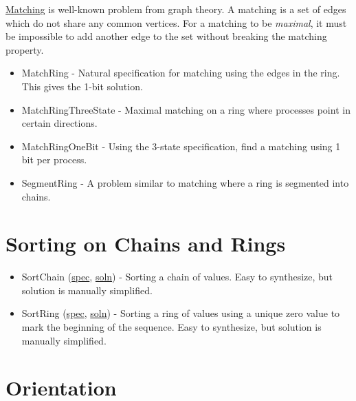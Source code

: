 \href{http://en.wikipedia.org/wiki/Matching_(graph_theory)}{Matching} is well-known problem from graph theory.
A matching is a set of edges which do not share any common vertices.
For a matching to be \textit{maximal}, it must be impossible to add another edge to the set without breaking the matching property.
\begin{itemize}
\item MatchRing \href{example/Matching.html#sec:MatchRing}{\LinkText}
- Natural specification for matching using the edges in the ring.
This gives the 1-bit solution.
\item MatchRingThreeState \href{example/Matching.html#sec:MatchRingThreeState}{\LinkText}
- Maximal matching on a ring where processes point in certain directions.
\item MatchRingOneBit \href{example/Matching.html#sec:MatchRingOneBit}{\LinkText}
- Using the 3-state specification, find a matching using 1 bit per process.
\item SegmentRing \href{example/Matching.html#sec:SegmentRing}{\LinkText}
- A problem similar to matching where a ring is segmented into chains.
\end{itemize}

\section{Sorting on Chains and Rings}

\begin{itemize}
\item SortChain (\href{\examplespec/SortChain.prot}{spec}, \href{\examplesoln/SortChain.prot}{soln})
- Sorting a chain of values.
Easy to synthesize, but solution is manually simplified.
\item SortRing (\href{\examplespec/SortRing.prot}{spec}, \href{\examplesoln/SortRing.prot}{soln})
- Sorting a ring of values using a unique zero value to mark the beginning of the sequence.
Easy to synthesize, but solution is manually simplified.
\end{itemize}

\section{Orientation}

